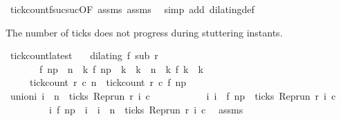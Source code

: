 \begin{isabellebody}
%
\isadelimproof
%
\endisadelimproof
%
\isatagproof
{}\isamarkupfalse%
\ tick{\isacharunderscore}count{\isacharunderscore}f{\isacharunderscore}suc{\isacharunderscore}suc{\isacharbrackleft}OF\ assms{\isacharbrackright}\ assms\ \isamarkupfalse%
\ {\isacharparenleft}simp\ add{\isacharcolon}\ dilating{\isacharunderscore}def{\isacharparenright}%
\endisatagproof
{\isafoldproof}%
%
\isadelimproof
%
\endisadelimproof
%
\begin{isamarkuptext}%
The number of ticks does not progress during stuttering instants.%
\end{isamarkuptext}\isamarkuptrue%
\isamarkupfalse%
\ tick{\isacharunderscore}count{\isacharunderscore}latest{\isacharcolon}\isanewline
\ \ \ {\isacartoucheopen}dilating\ f\ sub\ r{\isacartoucheclose}\isanewline
\ \ \ \ \ \ \ {\isacartoucheopen}f\ n\isactrlsub p\ {\isacharless}\ n\ {\isasymand}\ {\isacharparenleft}{\isasymforall}k{\isachardot}\ f\ n\isactrlsub p\ {\isacharless}\ k\ {\isasymand}\ k\ {\isasymle}\ n\ {\isasymlongrightarrow}\ {\isacharparenleft}{\isasymnexists}k\ f\ k\ {\isacharequal}\ k{\isacharparenright}{\isacharparenright}{\isacartoucheclose}\isanewline
\ \ \ \ \ {\isacartoucheopen}tick{\isacharunderscore}count\ r\ c\ n\ {\isacharequal}\ tick{\isacharunderscore}count\ r\ c\ {\isacharparenleft}f\ n\isactrlsub p{\isacharparenright}{\isacartoucheclose}\isanewline
%
\isadelimproof
%
\endisadelimproof
%
\isatagproof
{}\isamarkupfalse%
\ {\isacharminus}\isanewline
\ \ \isamarkupfalse%
\ union{\isacharcolon}{\isacartoucheopen}{\isacharbraceleft}i{\isachardot}\ i\ {\isasymle}\ n\ {\isasymand}\ ticks\ {\isacharparenleft}{\isacharparenleft}Rep{\isacharunderscore}run\ r{\isacharparenright}\ i\ c{\isacharparenright}{\isacharbraceright}\ {\isacharequal}\isanewline
\ \ \ \ \ \ \ \ \ \ {\isacharbraceleft}i{\isachardot}\ i\ {\isasymle}\ f\ n\isactrlsub p\ {\isasymand}\ ticks\ {\isacharparenleft}{\isacharparenleft}Rep{\isacharunderscore}run\ r{\isacharparenright}\ i\ c{\isacharparenright}{\isacharbraceright}\isanewline
\ \ \ \ \ \ \ \ {\isasymunion}\ {\isacharbraceleft}i{\isachardot}\ f\ n\isactrlsub p\ {\isacharless}\ i\ {\isasymand}\ i\ {\isasymle}\ n\ {\isasymand}\ ticks\ {\isacharparenleft}{\isacharparenleft}Rep{\isacharunderscore}run\ r{\isacharparenright}\ i\ c{\isacharparenright}{\isacharbraceright}{\isacartoucheclose}\ \isamarkupfalse%
\ assms{\isacharparenleft}{}{\isacharparenright}\ \isamarkupfalse%

\end{isabellebody}
